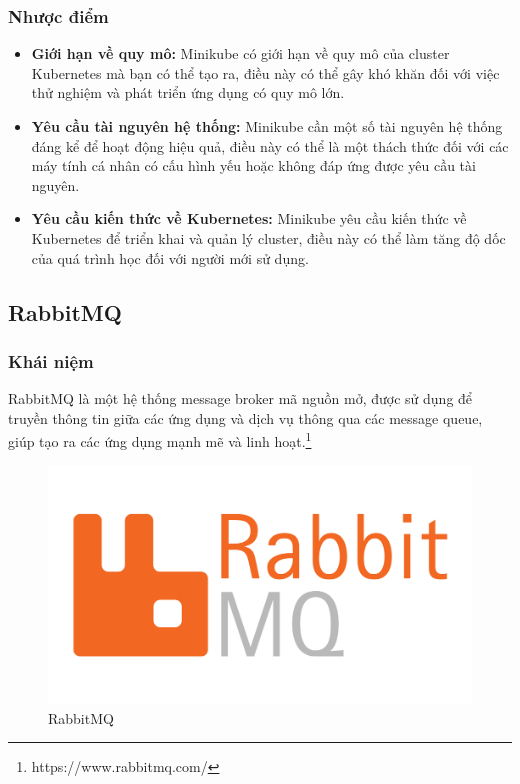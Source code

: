 \subsubsection{Nhược điểm}
\begin{itemize}
  \item \textbf{Giới hạn về quy mô:} Minikube có giới hạn về quy mô của cluster Kubernetes mà bạn có thể tạo ra, điều này có thể gây khó khăn đối với việc thử nghiệm và phát triển ứng dụng có quy mô lớn.
  \item \textbf{Yêu cầu tài nguyên hệ thống:} Minikube cần một số tài nguyên hệ thống đáng kể để hoạt động hiệu quả, điều này có thể là một thách thức đối với các máy tính cá nhân có cấu hình yếu hoặc không đáp ứng được yêu cầu tài nguyên.
  \item \textbf{Yêu cầu kiến thức về Kubernetes:} Minikube yêu cầu kiến thức về Kubernetes để triển khai và quản lý cluster, điều này có thể làm tăng độ dốc của quá trình học đối với người mới sử dụng.
\end{itemize}
\subsection{RabbitMQ}
\subsubsection{Khái niệm}
\noindent RabbitMQ là một hệ thống message broker mã nguồn mở, được sử dụng để truyền thông tin giữa các ứng dụng và dịch vụ thông qua các message queue, giúp tạo ra các ứng dụng mạnh mẽ và linh hoạt.\footnote{https://www.rabbitmq.com/}
\begin{figure}[H]
  \begin{center}
    \includegraphics[scale=0.3]{images/hieu/phuluc/rabbitmq.png}
    \caption{RabbitMQ}
  \end{center}
\end{figure}

